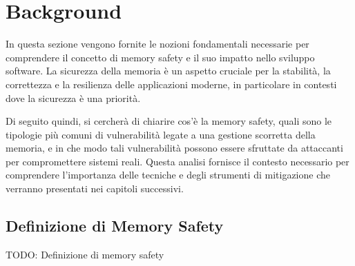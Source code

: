\chapter{Background}
\label{cha:background}

In questa sezione vengono fornite le nozioni fondamentali necessarie per
comprendere il concetto di memory safety e il suo impatto nello sviluppo
software. La sicurezza della memoria è un aspetto cruciale per la stabilità, la
correttezza e la resilienza delle applicazioni moderne, in particolare in contesti
dove la sicurezza è una priorità.

Di seguito quindi, si cercherà di chiarire cos'è la memory safety, quali sono le
tipologie più comuni di vulnerabilità legate a una gestione scorretta della memoria,
e in che modo tali vulnerabilità possono essere sfruttate da attaccanti per
compromettere sistemi reali. Questa analisi fornisce il contesto necessario per comprendere
l'importanza delle tecniche e degli strumenti di mitigazione che verranno presentati
nei capitoli successivi.

\section{Definizione di Memory Safety}
TODO: Definizione di memory safety